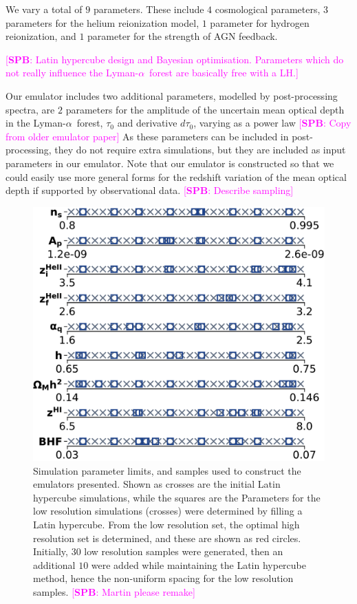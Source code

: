 \documentclass[a4paper,11pt]{article}
\newcommand{\spb}[1]{{\textcolor{magenta}{[{\bf SPB}: #1]}}}
\newcommand{\Lya}{Lyman-$\alpha$}
\begin{document}
We vary a total of $9$ parameters. These include $4$ cosmological parameters, $3$ parameters for the helium reionization model, $1$ parameter for hydrogen reionization, and $1$ parameter for the strength of AGN feedback.

\spb{Latin hypercube design and Bayesian optimisation. Parameters which do not really influence the \Lya~forest are basically free with a LH.}


Our emulator includes two additional parameters, modelled by post-processing spectra, are $2$ parameters for the amplitude of the uncertain mean optical depth in the \Lya~forest, $\tau_0$ and derivative $d\tau_0$, varying as a power law \spb{Copy from older emulator paper} As these parameters can be included in post-processing, they do not require extra simulations, but they are included as input parameters in our emulator. Note that our emulator is constructed so that we could easily use more general forms for the redshift variation of the mean optical depth if supported by observational data. \spb{Describe sampling}

\begin{figure}
    \centering
	\includegraphics[width=0.5\columnwidth]{figures/120box_42samples.pdf}
    \caption{Simulation parameter limits, and samples used to construct the emulators presented. Shown as crosses are the initial Latin hypercube simulations, while the squares are the
    Parameters for the low resolution simulations (crosses) were determined by filling a Latin hypercube.
    From the low resolution set, the optimal high resolution set is determined, and these are shown as red circles.
    Initially, $30$ low resolution samples were generated, then an additional $10$ were added while maintaining the Latin hypercube method, hence the non-uniform spacing for the low resolution samples. \spb{Martin please remake}}
    \label{fig:samples}
\end{figure}
\end{document}
